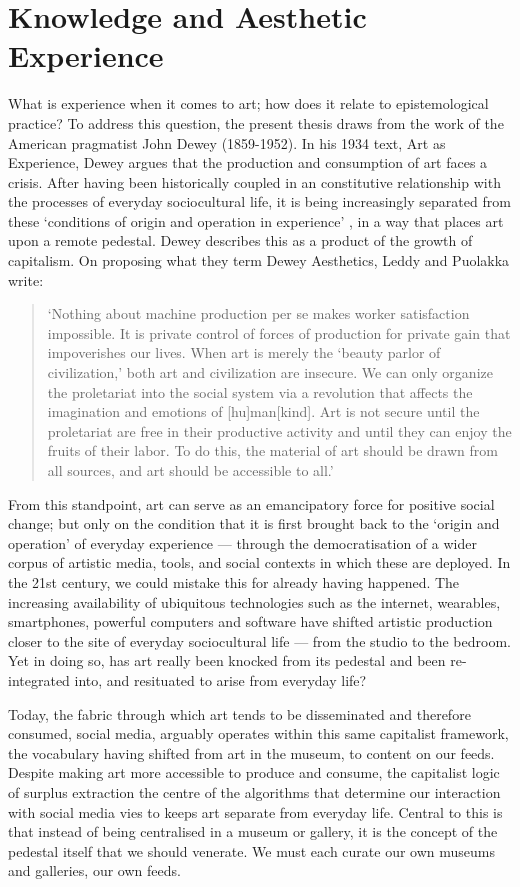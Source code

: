 \section{Knowledge and Aesthetic Experience}\label{sec: theory-experience}
What is experience when it comes to art; how does it relate to epistemological practice? To address this question, the present thesis draws from the work of the American pragmatist John Dewey (1859-1952). In his 1934 text, Art as Experience, Dewey argues that the production and consumption of art faces a crisis. After having been historically coupled in an constitutive relationship with the processes of everyday sociocultural life, it is being increasingly separated from these `conditions of origin and operation in experience' \citep{dewey1934}, in a way that places art upon a remote pedestal. Dewey describes this as a product of the growth of capitalism. On proposing what they term Dewey Aesthetics, Leddy and Puolakka write:
\begin{quote}
    `Nothing about machine production per se makes worker satisfaction impossible. It is private control of forces of production for private gain that impoverishes our lives. When art is merely the `beauty parlor of civilization,' both art and civilization are insecure. We can only organize the proletariat into the social system via a revolution that affects the imagination and emotions of [hu]man[kind]. Art is not secure until the proletariat are free in their productive activity and until they can enjoy the fruits of their labor. To do this, the material of art should be drawn from all sources, and art should be accessible to all.' \citeyearpar{leddy2021}
\end{quote}
From this standpoint, art can serve as an emancipatory force for positive social change; but only on the condition that it is first brought back to the `origin and operation' of everyday experience — through the democratisation of a wider corpus of artistic media, tools, and social contexts in which these are deployed. In the 21st century, we could mistake this for already having happened. The increasing availability of ubiquitous technologies such as the internet, wearables, smartphones, powerful computers and software have shifted artistic production closer to the site of everyday sociocultural life — from the studio to the bedroom. Yet in doing so, has art really been knocked from its pedestal and been re-integrated into, and resituated to arise from everyday life? 

Today, the fabric through which art tends to be disseminated and therefore consumed, social media, arguably operates within this same capitalist framework, the vocabulary having shifted from art in the museum, to content on our feeds. Despite making art more accessible to produce and consume, the capitalist logic of surplus extraction the centre of the algorithms that determine our interaction with social media vies to keeps art separate from everyday life. Central to this is that instead of being centralised in a museum or gallery, it is the concept of the pedestal itself that we should venerate. We must each curate our own museums and galleries, our own feeds.

